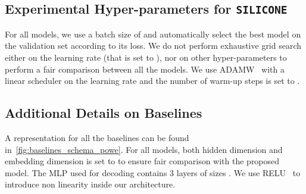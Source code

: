 \documentclass[11pt,a4paper]{article}
\begin{document}
\subsection{Experimental Hyper-parameters for \texttt{SILICONE}}
For all models, we use a batch size of  and automatically select the best model on the validation set according to its loss.
We do not perform exhaustive grid search either on the learning rate (that is set to ), nor on other hyper-parameters to perform a fair comparison between all the models. We use ADAMW~\cite{adam,adamW} with a linear scheduler on the learning rate and the number of warm-up steps is set to .

\subsection{Additional Details on Baselines}
A representation for all the baselines can be found in~\autoref{fig:baselines_schema_powe}. For all models, both hidden dimension and embedding dimension is set to  to ensure fair comparison with the proposed model. The MLP used for decoding contains 3 layers of sizes . We use RELU~\cite{relu} to introduce non linearity inside our architecture.
\end{document}
